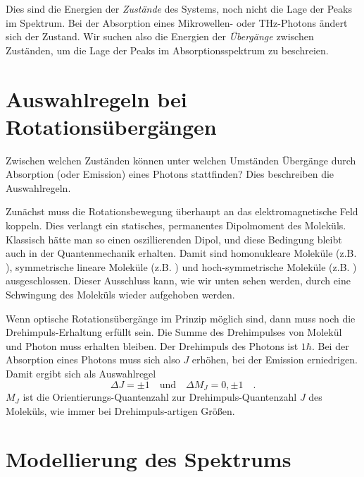 Dies sind die Energien der \emph{Zustände} des Systems, noch nicht die Lage der Peaks im Spektrum. Bei der Absorption eines Mikrowellen- oder THz-Photons ändert sich der Zustand. Wir suchen also die Energien der \emph{Übergänge} zwischen Zuständen, um die Lage der Peaks im Absorptionsspektrum zu beschreien.




\section{Auswahlregeln bei Rotationsübergängen}

Zwischen welchen Zuständen können unter welchen Umständen Übergänge durch Absorption (oder Emission) eines Photons stattfinden? Dies beschreiben  die Auswahlregeln.

Zunächst muss die Rotationsbewegung überhaupt an das elektromagnetische Feld koppeln. Dies verlangt  ein statisches, permanentes Dipolmoment des Moleküls. Klassisch hätte man so einen oszillierenden Dipol, und diese Bedingung bleibt auch in der Quantenmechanik erhalten. Damit sind homonukleare Moleküle (z.B. ), symmetrische lineare Moleküle (z.B. ) und hoch-symmetrische Moleküle (z.B. ) ausgeschlossen. Dieser Ausschluss kann, wie wir unten sehen werden, durch eine Schwingung des Moleküls wieder aufgehoben werden.

Wenn optische Rotationsübergänge im Prinzip möglich sind, dann muss noch die Drehimpuls-Erhaltung erfüllt sein. Die Summe des Drehimpulses von Molekül und Photon muss erhalten bleiben. Der Drehimpuls des Photons ist $1 \hbar$. Bei der Absorption eines Photons muss sich also $J$ erhöhen, bei der Emission erniedrigen. Damit ergibt sich als Auswahlregel
\begin{equation}
\Delta J = \pm 1 \quad \text{und} \quad \Delta M_J = 0, \pm 1 \quad .
\end{equation}
$M_J$ ist die Orientierungs-Quantenzahl zur Drehimpuls-Quantenzahl $J$ des Moleküls, wie immer bei Drehimpuls-artigen Größen.

\section{Modellierung des Spektrums}


